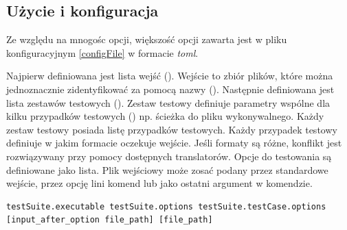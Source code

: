 \documentclass[a4paper,12pt]{article}
\begin{document}
\subsection{Użycie i konfiguracja} \label{benchmarkUsage}

Ze względu na mnogośc opcji, większość opcji zawarta jest w pliku konfiguracyjnym \ref{configFile} w formacie \textit{toml}.

Najpierw definiowana jest lista wejść (). Wejście to zbiór plików, które można jednoznacznie zidentyfikować za pomocą nazwy ().
Następnie definiowana jest lista zestawów testowych (). Zestaw testowy definiuje parametry wspólne dla kilku przypadków testowych () np. ścieżka do pliku wykonywalnego. Każdy zestaw testowy posiada listę przypadków testowych. Każdy przypadek testowy definiuje w jakim formacie oczekuje wejście. Jeśli formaty są różne, konflikt jest rozwiązywany przy pomocy dostępnych translatorów. Opcje do testowania są definiowane jako lista. Plik wejściowy może zosać podany przez standardowe wejście, przez opcję lini komend lub jako ostatni argument w komendzie.

\begin{verbatim}
testSuite.executable testSuite.options testSuite.testCase.options [input_after_option file_path] [file_path]
\end{verbatim}
\end{document}
